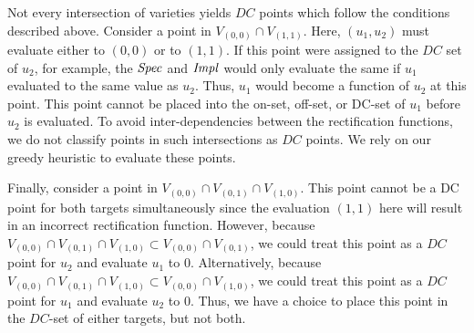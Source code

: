 Not every intersection of varieties yields $DC$ points 
which follow the conditions described above. 
Consider a point in $V_{(0,0)} \cap V_{(1,1)}$. Here, $(u_1, u_2)$ 
must evaluate either to $(0,0)$ or to $(1,1)$. If this point were 
assigned to the $DC$ set of $u_2$, for example, the ${\it Spec}$ and ${\it Impl}$ 
would only evaluate the same if $u_1$ evaluated to the same value as $u_2$.  
Thus, $u_1$ would become a function of $u_2$ at this point. This point 
cannot be placed into the on-set, off-set, or DC-set of $u_1$ before $u_2$ 
is evaluated. To avoid inter-dependencies between the rectification functions, we do not classify 
points in such intersections as $DC$ points. We rely on our greedy heuristic to 
evaluate these points. 



Finally, consider a point in $V_{(0,0)} \cap V_{(0,1)} \cap V_{(1,0)}$. 
This point cannot be a DC point for both targets simultaneously 
since the evaluation $(1,1)$ here will result in an incorrect rectification function. 
However, because $V_{(0,0)} \cap V_{(0,1)} \cap V_{(1,0)} \subset V_{(0,0)} \cap V_{(0,1)}$, 
we could treat this point as a $DC$ point for $u_2$ and evaluate $u_1$ to $0$. 
Alternatively, because $V_{(0,0)} \cap V_{(0,1)} \cap V_{(1,0)} \subset V_{(0,0)} \cap V_{(1,0)}$, 
we could treat this point as a $DC$ point for $u_1$ and evaluate $u_2$ to $0$.
Thus, we have a choice to place this point in the $DC$-set of either targets, but not both. 

